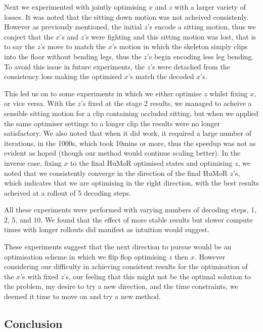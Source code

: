 Next we experimented with jointly optimising $x$ and $z$ with a larger variety of losses. It was noted that the sitting down motion was not acheived consistenly. However as previously mentioned, the initial $z$'s encode a sitting motion, thus we conject that the $x$'s and $z$'s were fighting and this sitting motion was lost, that is to say the $z$'s move to match the $x$'s motion in which the skeleton simply clips into the floor without bending legs, thus the $z$'s begin encoding less leg bending. To avoid this issue in future experiments, the $z$'s were detached from the consistency loss making the optimised $x$'s match the decoded $x$'s.

This led us on to some experiments in which we either optimise $z$ whilst fixing $x$, or vice versa. With the $z$'s fixed at the stage 2 results, we managed to acheive a sensible sitting motion for a clip containing occluded sitting, but when we applied the same optimiser settings to a longer clip the results were no longer satisfactory. We also noted that when it did work, it required a large number of iterations, in the 1000s, which took 10mins or more, thus the speedup was not as evident as hoped (though our method would continue scaling better). In the inverse case, fixing $x$ to the final HuMoR optimised states and optimising $z$, we noted that we consistently converge in the direction of the final HuMoR $z$'s, which indicates that we are optimising in the right direction, with the best results acheived at a rollout of 5 decoding steps.

All these experiments were performed with varying numbers of decoding steps, 1, 2, 5, and 10. We found that the effect of more stable results but slower compute times with longer rollouts did manifest as intuition would suggest. 

These experiments suggest that the next direction to pursue would be an optimisation scheme in which we flip flop optimising $z$ then $x$. However considering our difficulty in achieving consistent results for the optimisation of the $x$'s with fixed $z$'s, our feeling that this might not be the optimal solution to the problem, my desire to try a new direction, and the time constraints, we deemed it time to move on and try a new method.

\subsection{Conclusion}

